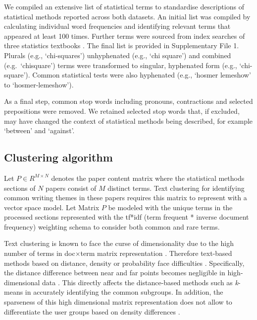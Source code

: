 \documentclass[12pt]{article}
\begin{document}
We compiled an extensive list of statistical terms to standardise
descriptions of statistical methods reported across both datasets. An
initial list was compiled by calculating individual word frequencies and
identifying relevant terms that appeared at least 100 times. Further
terms were sourced from index searches of three statistics textbooks
\citep[\citet{Diggle2013},\citet{Bland2015}]{Dobson2018}. The final list
is provided in Supplementary File 1. Plurals (e.g., `chi-squares')
unhyphenated (e.g., `chi square') and combined (e.g.~`chisquare') terms
were transformed to singular, hyphenated form (e.g., `chi-square').
Common statistical tests were also hyphenated (e.g., `hosmer lemeshow'
to `hosmer-lemeshow').

As a final step, common stop words including pronouns, contractions and
selected prepositions were removed. We retained selected stop words
that, if excluded, may have changed the context of statistical methods
being described, for example `between' and `against'.

\subsection{Clustering algorithm}

Let \(P \in R^{M \times N}\) denotes the paper content matrix where the
statistical methods sections of \(N\) papers consist of \(M\) distinct
terms. Text clustering for identifying common writing themes in these
papers requires this matrix to represent with a vector space model. Let
Matrix \(P\) be modeled with the unique terms in the processed sections
represented with the tf*idf (term frequent * inverse document frequency)
weighting schema to consider both common and rare terms.

Text clustering is known to face the curse of dimensionality due to the
high number of terms in doc\(\times\)term matrix representation
\citep[\citet{sutanto2018fine}]{aggarwal2012mining}. Therefore
text-based methods based on distance, density or probability face
difficulties
\citep[\citet{mohotti2018corpus},\citet{mohotti2019concept}]{park2018examining}.
Specifically, the distance difference between near and far points
becomes negligible in high-dimensional data \citep{aggarwal2012mining}.
This directly affects the distance-based methods such as
\textit{k}-means \cite{jain} in accurately identifying the common
subgroups. In addition, the sparseness of this high dimensional matrix
representation does not allow to differentiate the user groups based on
density differences
\citep[\citet{mohotti2018efficient}]{mohotti2018corpus}.
\end{document}
